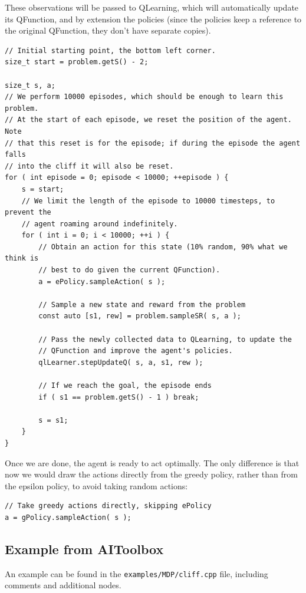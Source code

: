 \documentclass{article}
\begin{document}
These observations will be passed to QLearning, which will automatically update its QFunction, and by extension the policies 
(since the policies keep a reference to the original QFunction, they don't have separate copies).

\begin{tiny}
\begin{verbatim}
// Initial starting point, the bottom left corner.
size_t start = problem.getS() - 2;

size_t s, a;
// We perform 10000 episodes, which should be enough to learn this problem.
// At the start of each episode, we reset the position of the agent. Note
// that this reset is for the episode; if during the episode the agent falls
// into the cliff it will also be reset.
for ( int episode = 0; episode < 10000; ++episode ) {
	s = start;
	// We limit the length of the episode to 10000 timesteps, to prevent the
	// agent roaming around indefinitely.
	for ( int i = 0; i < 10000; ++i ) {
		// Obtain an action for this state (10% random, 90% what we think is
		// best to do given the current QFunction).
		a = ePolicy.sampleAction( s );
		
		// Sample a new state and reward from the problem
		const auto [s1, rew] = problem.sampleSR( s, a );
		
		// Pass the newly collected data to QLearning, to update the
		// QFunction and improve the agent's policies.
		qlLearner.stepUpdateQ( s, a, s1, rew );
		
		// If we reach the goal, the episode ends
		if ( s1 == problem.getS() - 1 ) break;
		
		s = s1;
	}
}
\end{verbatim}
\end{tiny}
Once we are done, the agent is ready to act optimally. 
The only difference is that now we would draw the actions directly from the greedy policy, rather than from the epsilon policy, to avoid taking random actions:

\begin{verbatim}
// Take greedy actions directly, skipping ePolicy
a = gPolicy.sampleAction( s );
\end{verbatim}

\subsection{Example from AIToolbox}
An example can be found in the \verb!examples/MDP/cliff.cpp! file, including comments and additional nodes.
\end{document}
